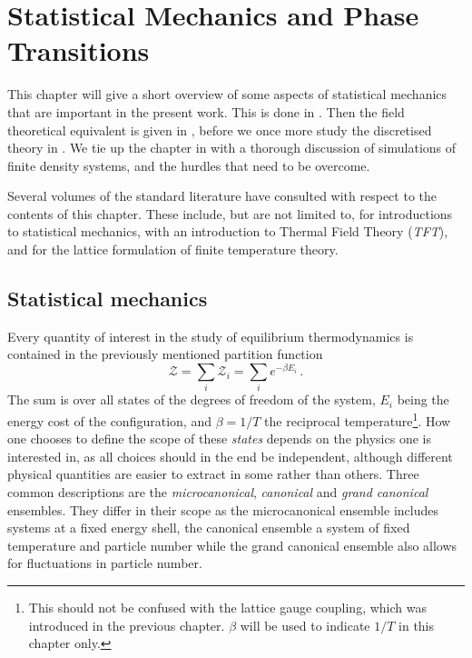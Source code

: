 \chapter{Statistical Mechanics and Phase Transitions} \label{chap3}

This chapter will give a short overview of some aspects of statistical mechanics
that are important in the present work. This is done in .
Then the field theoretical equivalent is given in
, before we once more study the discretised
theory in . We tie up the chapter 
in  with a
thorough discussion of simulations of finite density systems, and the hurdles
that need to be overcome.

Several volumes of the standard literature have consulted with respect to
the contents of this chapter. These include, but are not limited to,
\cite{landau2013statistical,pathria2011statistical} for introductions to
statistical mechanics, \cite{kapusta2006finite} with an introduction to Thermal
Field Theory (\emph{TFT}), and \cite{montvay1997quantum,Philipsen:2010gj} for
the lattice formulation of finite temperature theory.

\section{Statistical mechanics} \label{sec:stat-mech}

Every quantity of interest in the study of equilibrium thermodynamics is
contained in the previously mentioned partition function
%
\begin{equation} \label{eq:sm-partition-function} \mathcal{Z} = \sum_i
  \mathcal{Z}_i = \sum_i e^{-\beta E_i} \,.  \end{equation}
%
The sum is over all states of the degrees of freedom of the system, $E_i$
being the energy cost of the configuration, and $\beta = 1/T$ the reciprocal
temperature\footnote{This should not be confused with the lattice gauge
  coupling, which was introduced in the previous chapter. $\beta$ will
  be used to indicate $1/T$ in this chapter only.}. How one chooses
to define the scope of these \emph{states} depends on the physics one is
interested in, as all choices should in the end be independent,
although different physical quantities are easier to extract in some rather than
others. Three common descriptions are the \emph{microcanonical},
\emph{canonical} and \emph{grand canonical} ensembles.  They differ in their
scope as the microcanonical ensemble includes systems at a fixed energy shell,
the canonical ensemble a system of fixed temperature and particle number while
the grand canonical ensemble also allows for fluctuations in particle number.

